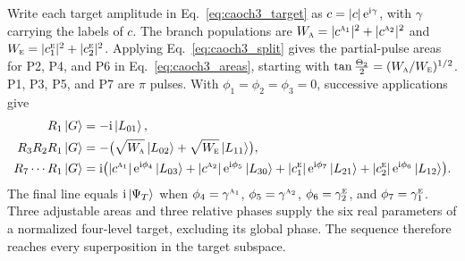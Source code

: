 Write each target amplitude in Eq.~\eqref{eq:caoch3_target} as $c=|c|\,\mathrm{e}^{\mathrm{i}\gamma}$, with $\gamma$ carrying the labels of $c$. The branch populations are $W_{\text{\normalfont\scshape a}}=|c^{\text{\normalfont\scshape a}_{1}}|^2+|c^{\text{\normalfont\scshape a}_{2}}|^2$ and $W_{\text{\normalfont\scshape e}}=|c^{\text{\normalfont\scshape e}}_{1}|^2+|c^{\text{\normalfont\scshape e}}_{2}|^2$. Applying Eq.~\eqref{eq:caoch3_split} gives the partial-pulse areas for P2, P4, and P6 in Eq.~\eqref{eq:caoch3_areas}, starting with $\tan\tfrac{\Theta_2}{2}=(W_{\text{\normalfont\scshape a}}/W_{\text{\normalfont\scshape e}})^{1/2}$. P1, P3, P5, and P7 are $\pi$ pulses. With $\phi_1=\phi_2=\phi_3=0$, successive applications give
\begin{align}
R_1\ket{G}&=-\mathrm{i}\ket{L_{01}},\nonumber\\
R_3R_2R_1\ket{G}&=-\bigl(\sqrt{W_{\text{\normalfont\scshape a}}}\ket{L_{02}}+\sqrt{W_{\text{\normalfont\scshape e}}}\ket{L_{11}}\bigr),\nonumber\\
R_7\cdots R_1\ket{G}&=\mathrm{i}\bigl(|c^{\text{\normalfont\scshape a}_{1}}|\,\mathrm{e}^{\mathrm{i}\phi_4}\ket{L_{03}}+|c^{\text{\normalfont\scshape a}_{2}}|\,\mathrm{e}^{\mathrm{i}\phi_5}\ket{L_{30}}+|c^{\text{\normalfont\scshape e}}_{1}|\,\mathrm{e}^{\mathrm{i}\phi_7}\ket{L_{21}}+|c^{\text{\normalfont\scshape e}}_{2}|\,\mathrm{e}^{\mathrm{i}\phi_6}\ket{L_{12}}\bigr).
\label{eq:caoch3_layers}
\end{align}
The final line equals $\mathrm{i}\ket{\Psi_T}$ when $\phi_4=\gamma^{\text{\normalfont\scshape a}_{1}}$, $\phi_5=\gamma^{\text{\normalfont\scshape a}_{2}}$, $\phi_6=\gamma^{\text{\normalfont\scshape e}}_{2}$, and $\phi_7=\gamma^{\text{\normalfont\scshape e}}_{1}$. Three adjustable areas and three relative phases supply the six real parameters of a normalized four-level target, excluding its global phase. The sequence therefore reaches every superposition in the target subspace. 

